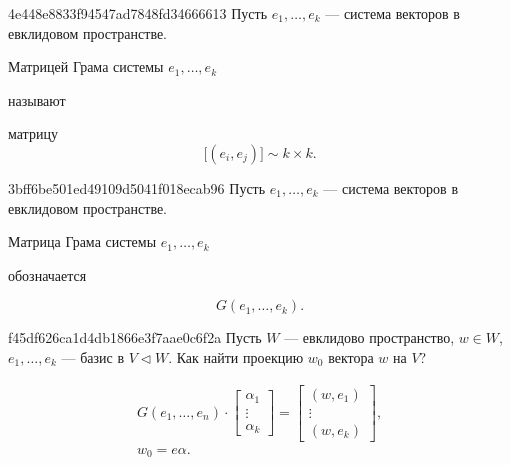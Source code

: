 \begin{note}{4e448e8833f94547ad7848fd34666613}
    Пусть \({ e_1, \ldots, e_k }\) --- система векторов в евклидовом пространстве.
    \begin{icloze}{2}Матрицей Грама системы \({ e_1, \ldots, e_k }\)\end{icloze} называют \begin{icloze}{1}матрицу
    \[
        \Big[ \left( e_i, e_j \right) \Big] \sim k \times k.
    \]\end{icloze}
\end{note}

\begin{note}{3bff6be501ed49109d5041f018ecab96}
    Пусть \({ e_1, \ldots, e_k }\) --- система векторов в евклидовом пространстве.
    \begin{icloze}{2}Матрица Грама системы \({ e_1, \ldots, e_k }\)\end{icloze} обозначается
    \begin{icloze}{1}
        \[
            G(e_1, \ldots, e_k).
        \]
    \end{icloze}
\end{note}

\begin{note}{f45df626ca1d4db1866e3f7aae0c6f2a}
    Пусть \({ W }\) --- евклидово пространство, \({ w \in W }\), \({ e_1, \ldots, e_k }\) --- базис в \({ V \triangleleft W }\).
    Как найти проекцию \({ w_0 }\) вектора \({ w }\) на \({ V }\)?

    \begin{cloze}{1}
        \[
            \begin{gathered}
                G(e_1, \ldots, e_n) \cdot \begin{bmatrix}
                    \alpha_1 \\ \vdots \\ \alpha_k
                \end{bmatrix}
                =
                \begin{bmatrix}
                    (w, e_1) \\ \vdots \\ (w, e_k)
                \end{bmatrix}, \\
                w_0 = e\alpha.
            \end{gathered}
        \]
    \end{cloze}
\end{note}

